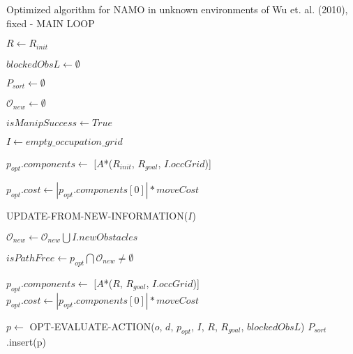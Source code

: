 \begin{algorithm}[H]

  \caption{Optimized algorithm for NAMO in unknown environments of Wu et. al. (2010), fixed - MAIN LOOP}

  \label{alg:01-wu-optimized-part1}

  \begin{algorithmic}[1]


        \State $R \gets R_{init}$ \label{lst:line:01_plan_execution_loop_1}

        \State $blockedObsL \gets \emptyset$

        \State $P_{sort} \gets \emptyset$

        \State $\mathcal{O}_{new} \gets \emptyset$

        \State $isManipSuccess \gets True$

        \State $I \gets empty\_occupation\_grid$

        \State $p_{opt}.components \gets$ [$A$*($R_{init}$, $R_{goal}$, $I.occGrid$)]

        \State $p_{opt}.cost \gets |p_{opt}.components[0]| * moveCost$


          \State UPDATE-FROM-NEW-INFORMATION($I$)\label{lst:line:update-from-new-information_note}

          \State $\mathcal{O}_{new} \gets \mathcal{O}_{new} \bigcup I.newObstacles$

          \State $isPathFree \gets p_{opt} \bigcap \mathcal{O}_{new} \neq \emptyset$ \label{lst:line:intersection_note}


            \State $p_{opt}.components \gets$ [$A$*($R$, $R_{goal}$, $I.occGrid$)]
            \State $p_{opt}.cost \gets |p_{opt}.components[0]| * moveCost$ \label{lst:line:01_plan_execution_loop_2}

             \label{lst:line:01_obstacle evaluation_loop_1}
                \State $p \gets$ OPT-EVALUATE-ACTION($o$, $d$, $p_{opt}$, $I$, $R$, $R_{goal}$, $blockedObsL$)
                  \State $P_{sort}$.insert(p)
                \EndIf
              \EndFor
            \EndFor


\end{algorithmic}
\end{algorithm}
